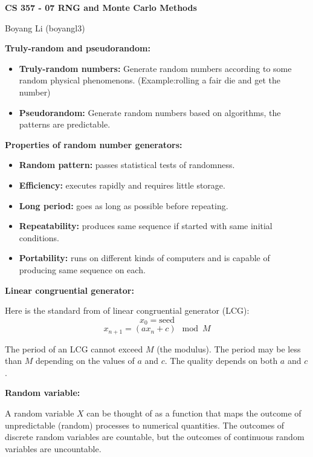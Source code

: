 \documentclass[12pt]{article}
\begin{document}
\begin{center}\Large\bf 
CS 357 - 07 RNG and Monte Carlo Methods\\
\end{center}
\begin{center}
Boyang Li (boyangl3)
\end{center}

\medskip
\noindent \textbf{Truly-random and pseudorandom:}
    \begin{itemize}
        \item \textbf{Truly-random numbers:} Generate random numbers according to some random physical phenomenons. (Example:rolling a fair die and get the number)
        \item \textbf{Pseudorandom:} Generate random numbers based on algorithms, the patterns are predictable.
    \end{itemize}

\medskip
\noindent \textbf{Properties of random number generators:}
    \begin{itemize}
        \item \textbf{Random pattern:} passes statistical tests of randomness.
        \item \textbf{Efficiency:} executes rapidly and requires little storage.
        \item \textbf{Long period:} goes as long as possible before repeating.
        \item \textbf{Repeatability:} produces same sequence if started with same initial conditions.
        \item \textbf{Portability:} runs on different kinds of computers and is capable of producing same sequence on each.
    \end{itemize}

\medskip
\noindent \textbf{Linear congruential generator:}

    Here is the standard from of linear congruential generator (LCG):
    $$x_0 = \text{seed}$$
    $$x_{n+1} = (a x_{n} + c) \mod{M}$$
    
    The period of an LCG cannot exceed $M$ (the modulus). The period may be less than $M$ depending on the values of $a$ and $c$. The quality depends on both $a$ and $c$.

\medskip
\noindent \textbf{Random variable:}

    A random variable $X$ can be thought of as a function that maps the outcome of unpredictable (random) processes to numerical quantities. The outcomes of discrete random variables are countable, but the outcomes of continuous random variables are uncountable.
\end{document}
